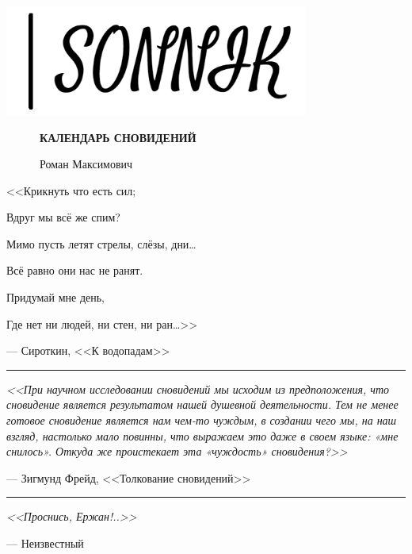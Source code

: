 \documentclass[openany, oneside]{book}
\newcommand{\vf}{\vspace{5mm}}
\begin{document}
\thispagestyle{empty}

\emptysymbol

\vspace{70mm}

\includegraphics[width=10cm]{pictures/sonnik2.png}

\vspace{10mm}

\ \ \ \ \ \ {\LARGE \bfseries КАЛЕНДАРЬ СНОВИДЕНИЙ}

\vspace{7mm}

\ \ \ \ \ \ {\LARGE Роман Максимович}

\large

\newpage

\emptysymbol

\vspace{2cm}

\begin{flushleft}
{\it

<<Крикнуть что есть сил;

Вдруг мы всё же спим?

\vf

Мимо пусть летят стрелы, слёзы, дни\dots

Всё равно они нас не ранят.

\vf

Придумай мне день,

Где нет ни людей, ни стен, ни ран\dots>>}

\vf

--- Сироткин, <<К водопадам>>

\vf
\vf

\rule{\textwidth}{.7pt}

\vf
\vf

{\it <<При научном исследовании сновидений мы исходим из предположения, что сновидение является результатом нашей душевной деятельности. Тем не менее готовое сновидение является нам чем-то чуждым, в создании чего мы, на наш взгляд, настолько мало повинны, что выражаем это даже в своем языке: «мне снилось». Откуда же проистекает эта «чуждость» сновидения?>>}

\vf

--- Зигмунд Фрейд, <<Толкование сновидений>>

\vf
\vf

\rule{\textwidth}{.7pt}

\vf
\vf

{\it <<Проснись, Ержан!..>>}

\vf

--- Неизвестный

\end{flushleft}
\end{document}
